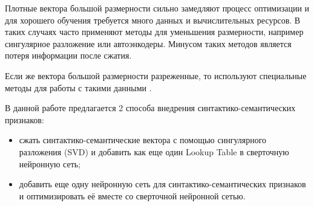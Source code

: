    Плотные вектора большой размерности сильно замедляют процесс оптимизации и для хорошего
    обучения требуется много данных и вычислительных ресурсов.
    В таких случаях часто применяют методы для уменьшения размерности,
    например сингулярное разложение или автоэнкодеры. Минусом таких методов является потеря информации
    после сжатия.

    Если же вектора большой размерности разреженные, то используют специальные методы для
    работы с такими данными \citep{davissurvey}.

    В данной работе предлагается 2 способа внедрения синтактико-семантических признаков:
    \begin{itemize}
      \item сжать синтактико-семантические вектора с помощью сингулярного разложения (SVD) и добавить
      как еще один Lookup Table в сверточную нейронную сеть;
      \item добавить еще одну нейронную сеть для синтактико-семантических признаков и оптимизировать
      её вместе со сверточной нейронной сетью.
    \end{itemize}
